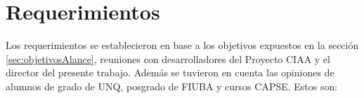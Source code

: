 \section{Requerimientos}
\label{sec:requerimientos}




Los requerimientos se establecieron en base a los objetivos expuestos en la sección \ref{sec:objetivosAlance}, reuniones con desarrolladores del Proyecto CIAA y el director del presente trabajo. Además se tuvieron en cuenta las opiniones de alumnos de grado de UNQ, posgrado de FIUBA y cursos CAPSE. Estos son:

